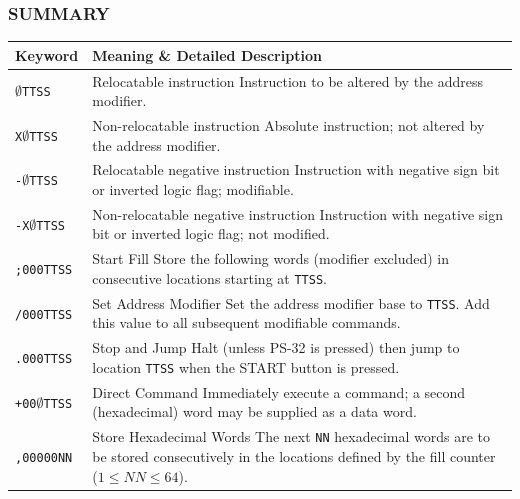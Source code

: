 \subsubsection*{SUMMARY}
\begin{longtable}{l p{9.5cm}}
\toprule
\textbf{Keyword} & \textbf{Meaning \& Detailed Description} \\
\midrule
\endhead
\bottomrule
\endfoot

\texttt{$\emptyset$TTSS} & Relocatable instruction \newline Instruction to be altered by the address modifier. \\
\addlinespace
\texttt{X$\emptyset$TTSS} & Non-relocatable instruction \newline Absolute instruction; not altered by the address modifier. \\
\addlinespace
\texttt{-$\emptyset$TTSS} & Relocatable negative instruction \newline Instruction with negative sign bit or inverted logic flag; modifiable. \\
\addlinespace
\texttt{-X$\emptyset$TTSS} & Non-relocatable negative instruction \newline Instruction with negative sign bit or inverted logic flag; not modified. \\
\addlinespace
\texttt{;000TTSS} & Start Fill \newline Store the following words (modifier excluded) in consecutive locations starting at \texttt{TTSS}. \\
\addlinespace
\texttt{/000TTSS} & Set Address Modifier \newline Set the address modifier base to \texttt{TTSS}. Add this value to all subsequent modifiable commands. \\
\addlinespace
\texttt{.000TTSS} & Stop and Jump \newline Halt (unless \textsf{PS-32} is pressed) then jump to location \texttt{TTSS} when the \textsf{START} button is pressed. \\
\addlinespace
\texttt{+00$\emptyset$TTSS} & Direct Command \newline Immediately execute a command; a second (hexadecimal) word may be supplied as a data word. \\
\addlinespace
\texttt{,00000NN} & Store Hexadecimal Words \newline The next \texttt{NN} hexadecimal words are to be stored consecutively in the locations defined by the fill counter ($1 \le NN \le 64$). \\

\end{longtable}
